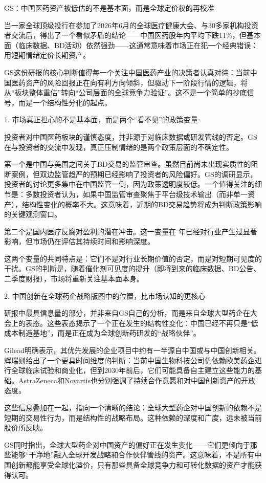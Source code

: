 \documentclass[11pt]{ctexart}
\begin{document}
GS：中国医药资产被低估的不是基本面，而是全球定价权的再校准

当一家全球顶级投行在参加了2026年6月的全球医疗健康大会、与30多家机构投资者交流后，得出了一个看似矛盾的结论——中国医药股年内平均下跌11\%，但基本面（临床数据、BD活动）依然强劲——这通常意味着市场正在犯一个经典错误：用短期情绪定价长期资产。

GS这份研报的核心判断值得每一个关注中国医药产业的决策者认真对待：当前中国医药资产的风险回报正在向有利方向倾斜，但驱动下一阶段行情的逻辑，将从“板块整体重估”转向“公司层面的全球竞争力验证”。这不是一个简单的抄底信号，而是一个结构性分化的起点。

1. 市场真正担心的不是基本面，而是两个“看不见”的政策变量

投资者对中国医药板块的谨慎态度，并非源于对临床数据或研发管线的否定。GS在与投资者的交流中发现，真正压制情绪的是两个政策层面的不确定性。

第一个是中国与美国之间关于BD交易的监管审查。虽然目前尚未出现实质性的阻断案例，但双边监管趋严的预期已经影响了投资者的风险偏好。GS的调研显示，投资者的讨论更多集中在中国监管一侧，因为政策透明度较低。一个值得关注的细节是：多数投资者认为，如果中国监管审查聚焦于平台级技术输出（而非单一资产），结构性变化的概率不大。这意味着，近期的BD交易趋势将成为判断政策影响的关键观测窗口。

第二个是国内医疗反腐对盈利的潜在冲击。这一变量在 年已经对行业产生过显著影响，但市场仍在评估其持续时间和影响深度。

这两个变量的共同特点是：它们不是对行业长期价值的否定，而是对短期可见度的干扰。GS的判断是，随着催化剂可见度的提升（即将到来的临床数据、BD公告、二季度财报），市场将重新关注基本面本身。

2. 中国创新在全球药企战略版图中的位置，比市场认知的更核心

研报中最具信息量的部分，并非来自GS自己的分析，而是来自全球大型药企在大会上的表态。这些表态揭示了一个正在发生的结构性变化：中国已经不再只是“低成本制造基地”，而是正在成为全球创新药研发的“战略伙伴”。

Gilead明确表示，其优先发展的企业项目中约有一半源自中国或与中国创新相关。辉瑞则给出了一个更具时间维度的判断：当前中国生物科技公司仍依赖欧美药企进行全球临床试验和商业化，但到2030年前后，它们可能具备自主建立这些能力的基础。AstraZeneca和Novartis也分别强调了持续合作意愿和对中国创新资产的开放态度。

这些信息叠加在一起，指向一个清晰的结论：全球大型药企对中国创新的依赖不是短期的交易性行为，而是结构性的战略布局。这种依赖的深度和广度，远未被当前股价所反映。

GS同时指出，全球大型药企对中国资产的偏好正在发生变化——它们更倾向于那些能够“干净地”融入全球开发战略和合作伙伴管线的资产。这意味着，不是所有中国创新都能享受全球化溢价，只有那些具备全球竞争力和可转化数据的资产才能获得认可。
\end{document}

